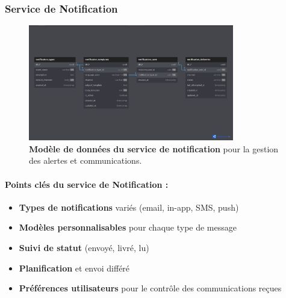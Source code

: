 \subsubsection{Service de Notification}
\begin{figure}[p]
  \centering
  \includegraphics[width=0.8\textwidth,keepaspectratio]{week_1_img/services_db_screanshots/Screenshot 2025-06-06 at 15-08-13 Notification_Service.pdf.png}
  \caption{\textbf{Modèle de données du service de notification} pour la gestion des alertes et communications.}
  \label{fig:notification_service}
\end{figure}

\vspace{5pt}
\small
\paragraph{Points clés du service de Notification :}
\begin{itemize}[leftmargin=*,noitemsep,topsep=0pt]
  \item \textbf{Types de notifications} variés (email, in-app, SMS, push)
  \item \textbf{Modèles personnalisables} pour chaque type de message
  \item \textbf{Suivi de statut} (envoyé, livré, lu)
  \item \textbf{Planification} et envoi différé
  \item \textbf{Préférences utilisateurs} pour le contrôle des communications reçues
\end{itemize}
\normalsize
\clearpage

